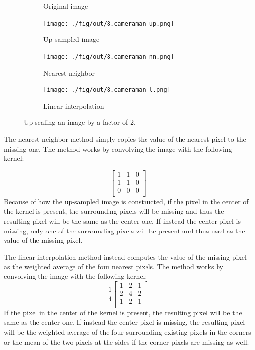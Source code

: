 \documentclass[tikz,14pt,fleqn]{article}
\begin{document}
\begin{figure}[H]
    \vspace*{-1cm}
    \centering
    \begin{subfigure}{0.24\linewidth}
        \centering
        \caption{Original image}
        \label{fig:ex6a}
    \end{subfigure}
    \begin{subfigure}{0.24\linewidth}
        \centering
        \texttt{[image: ./fig/out/8.cameraman\_up.png]}
        \caption{Up-sampled image}
        \label{fig:ex6b}
    \end{subfigure}
    \begin{subfigure}{0.24\linewidth}
        \centering
        \texttt{[image: ./fig/out/8.cameraman\_nn.png]}
        \caption{Nearest neighbor}
        \label{fig:ex6c}
    \end{subfigure}
    \begin{subfigure}{0.24\linewidth}
        \centering
        \texttt{[image: ./fig/out/8.cameraman\_l.png]}
        \caption{Linear interpolation}
        \label{fig:ex6d}
    \end{subfigure}
    \caption{Up-scaling an image by a factor of 2.}
    \label{fig:ex6}
\end{figure}

The nearest neighbor method simply copies the value of the nearest pixel to the missing one. The method works by convolving the image with the following kernel:

$$\begin{bmatrix}
1 & 1 & 0 \\
1 & 1 & 0 \\
0 & 0 & 0 \\
\end{bmatrix}$$
Because of how the up-sampled image is constructed, if the pixel in the center of the kernel is present, the surrounding pixels will be missing and thus the resulting pixel will be the same as the center one. If instead the center pixel is missing, only one of the surrounding pixels will be present and thus used as the value of the missing pixel.


The linear interpolation method instead computes the value of the missing pixel as the weighted average of the four nearest pixels. The method works by convolving the image with the following kernel:
$$\frac14\begin{bmatrix}
    1 & 2 & 1 \\
    2 & 4 & 2 \\
    1 & 2 & 1 \\
\end{bmatrix}$$
If the pixel in the center of the kernel is present, the resulting pixel will be the same as the center one. If instead the center pixel is missing, the resulting pixel will be the weighted average of the four surrounding existing pixels in the corners or the mean of the two pixels at the sides if the corner pixels are missing as well.
\end{document}

